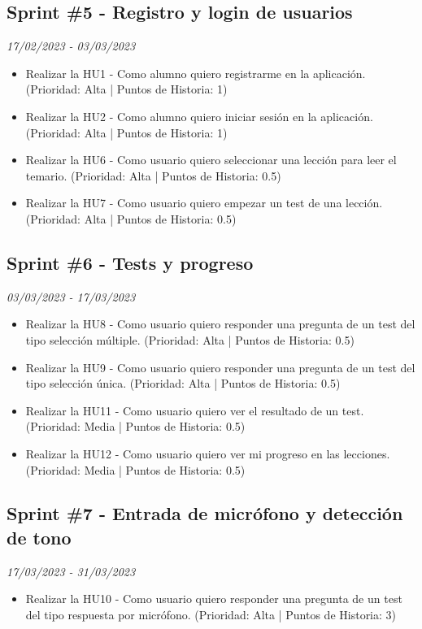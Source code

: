 \subsection{Sprint \#5 - Registro y login de usuarios}
\textit{17/02/2023   -   03/03/2023}
\begin{itemize}
    \item Realizar la HU1 - Como alumno quiero registrarme en la aplicación. (Prioridad: Alta | Puntos de Historia: 1)
    \item Realizar la HU2 - Como alumno quiero iniciar sesión en la aplicación. (Prioridad: Alta | Puntos de Historia: 1)
    \item Realizar la HU6 - Como usuario quiero seleccionar una lección para leer el temario. (Prioridad: Alta | Puntos de Historia: 0.5)
    \item Realizar la HU7 - Como usuario quiero empezar un test de una lección. (Prioridad: Alta | Puntos de Historia: 0.5)
\end{itemize}


\subsection{Sprint \#6 - Tests y progreso}
\textit{03/03/2023   -   17/03/2023}
\begin{itemize}
    \item Realizar la HU8 - Como usuario quiero responder una pregunta de un test del tipo selección múltiple. (Prioridad: Alta | Puntos de Historia: 0.5)
    \item Realizar la HU9 - Como usuario quiero responder una pregunta de un test del tipo selección única. (Prioridad: Alta | Puntos de Historia: 0.5)
    \item Realizar la HU11 - Como usuario quiero ver el resultado de un test. (Prioridad: Media | Puntos de Historia: 0.5)
    \item Realizar la HU12 - Como usuario quiero ver mi progreso en las lecciones. (Prioridad: Media | Puntos de Historia: 0.5)

\end{itemize}

\subsection{Sprint \#7 - Entrada de micrófono y detección de tono}
\textit{17/03/2023   -   31/03/2023}
\begin{itemize}
    \item Realizar la HU10 - Como usuario quiero responder una pregunta de un test del tipo respuesta por micrófono. (Prioridad: Alta | Puntos de Historia: 3)
\end{itemize}

